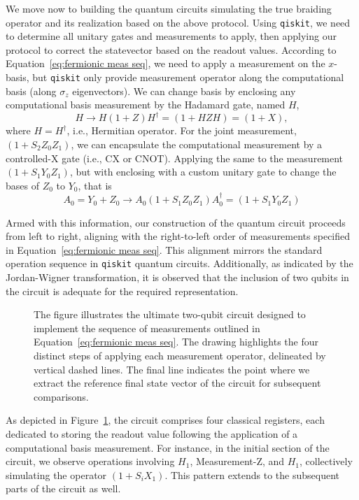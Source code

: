 \documentclass{article}
\begin{document}
\vspace{12pt}
We move now to building the quantum circuits simulating the true braiding operator and its realization based on the above protocol. Using \texttt{qiskit}, we need to determine all unitary gates and measurements to apply, then applying our protocol to correct the statevector based on the readout values. According to Equation~\ref{eq:fermionic meas seq}, we need to apply a measurement on the $ x $-basis, but \texttt{qiskit} only provide measurement operator along the computational basis (along $ \sigma_z $ eigenvectors). We can change basis by enclosing any computational basis measurement by the Hadamard gate, named $ H $,
\[
	H \rightarrow H (1 + Z) H^\dagger = (1 + HZH) = (1 + X),
\]
where $ H = H^\dagger $, i.e., Hermitian operator. For the joint measurement, $ (1 + S_2 Z_0 Z_1) $, we can encapsulate the computational measurement by a controlled-X gate (i.e., CX or CNOT). Applying the same to the measurement $ (1 + S_1 Y_0 Z_1) $, but with enclosing with a custom unitary gate to change the bases of $ Z_0 $ to $ Y_0 $, that is
\[
	A_0 = Y_0 + Z_0 \rightarrow A_0(1 + S_1 Z_0 Z_1)A_0^\dagger = (1 + S_1 Y_0 Z_1)
\]

Armed with this information, our construction of the quantum circuit proceeds from left to right, aligning with the right-to-left order of measurements specified in Equation~\ref{eq:fermionic meas seq}. This alignment mirrors the standard operation sequence in \texttt{qiskit} quantum circuits. Additionally, as indicated by the Jordan-Wigner transformation, it is observed that the inclusion of two qubits in the circuit is adequate for the required representation.
\begin{figure}
	\begin{center}
		
	\end{center}
	\caption{The figure illustrates the ultimate two-qubit circuit designed to implement the sequence of measurements outlined in Equation~\ref{eq:fermionic meas seq}. The drawing highlights the four distinct steps of applying each measurement operator, delineated by vertical dashed lines. The final line indicates the point where we extract the reference final state vector of the circuit for subsequent comparisons.}\label{fig:meas q circuit}
\end{figure}
As depicted in Figure~\ref{fig:meas q circuit}, the circuit comprises four classical registers, each dedicated to storing the readout value following the application of a computational basis measurement. For instance, in the initial section of the circuit, we observe operations involving \(H_1\), Measurement-Z, and \(H_1\), collectively simulating the operator \((1 + S_i X_1)\). This pattern extends to the subsequent parts of the circuit as well.
\end{document}
